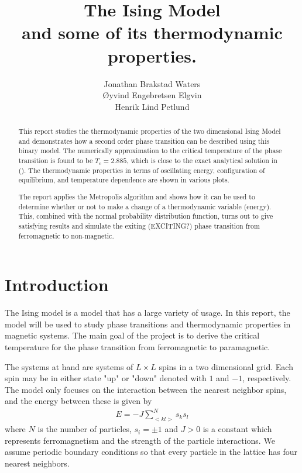 \documentclass[12pt,english,a4paper]{article}
\title{The Ising Model \\ and some of its thermodynamic properties.}
\author{Jonathan Brakstad Waters\\Øyvind Engebretsen Elgvin\\Henrik Lind Petlund}
\begin{document}
\begin{titlepage}
\vfill
\maketitle
\begin{abstract}

This report studies the thermodynamic properties of the two dimensional Ising Model and demonstrates how a second order phase transition can be described using this binary model. The numerically approximation to the critical temperature of the phase transition is found to be $T_c = 2.885$, which is close to the exact analytical solution in (\cite{LarsOns}). The thermodynamic properties in terms of oscillating energy, configuration of equilibrium, and temperature dependence are shown in various plots.

The report applies the Metropolis algorithm and shows how it can be used to determine whether or not to make a change of a thermodynamic variable (energy). This, combined with the normal probability distribution function, turns out to give satisfying results and simulate the exiting (EXCITING?) phase transition from ferromagnetic to non-magnetic.

\newpage

\end{abstract}
\tableofcontents
\end{titlepage}

\section{Introduction} \label{introduction}

The Ising model is a model that has a large variety of usage. In this report, the model will be used to study phase transitions and thermodynamic properties in magnetic systems. The main goal of the project is to derive the critical temperature for the phase transition from ferromagnetic to paramagnetic. 

The systems at hand are systems of $L\times L$ spins in a two dimensional grid. Each spin may be in either state "up" or "down" denoted with $1$ and $-1$, respectively. The model only focuses on the interaction between the nearest neighbor spins, and the energy between these is given by
\begin{align}
    E = -J \sum_{<kl>}^N s_ks_l 
\end{align}
where $N$ is the number of particles, $s_i=\pm 1$ and $J>0$ is a constant which represents ferromagnetism and the strength of the particle interactions. We assume periodic boundary conditions so that every particle in the lattice has four nearest neighbors. 
\end{document}
